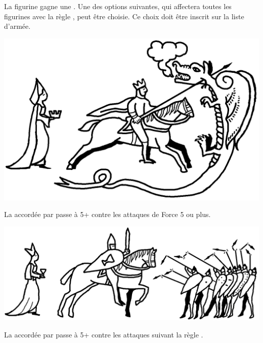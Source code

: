 

\startarmyspecialrules

\armyspecialruleentry{\theblessing}

La figurine gagne une . Une des options suivantes, qui affectera toutes les figurines avec la règle \theblessing{}, peut être choisie. Ce choix doit être inscrit sur la liste d'armée.

\begin{multicols}{2}
\begin{center}
\includegraphics[scale=0.18]{pics/tokenoftheking.png}

\vspace*{5pt}
\textbf{\tokenoftheking}

\vspace*{5pt}
La \wardsave{} accordée par \theblessing{} passe à 5+ contre les attaques de Force 5 ou plus.
\end{center}

\columnbreak

\begin{center}
\vspace*{\fill}
\includegraphics[scale=0.18]{pics/tokenofthegrail.png}
\vspace*{26pt}

\textbf{\tokenofthegrail}

\vspace*{5pt}
La \wardsave{} accordée par \theblessing{} passe à 5+ contre les attaques suivant la règle \armourpiercing{}.
\end{center}
\end{multicols}

